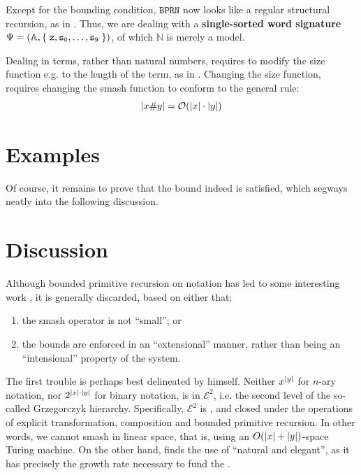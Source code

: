 Except for the bounding condition, $\mathtt{BPRN}$ now looks like a regular
structural recursion, as in . Thus, we are dealing
with a \textbf{single-sorted word signature} $\Psi = {\mathopen{}\left({\mathbb{A},
\mathopen{}\left\{\mathrel{}{\mathtt{z}, \mathtt{s_0}, \ldots, \mathtt{s_9}}\mathrel{}\right\}\mathclose{}}\right)\mathclose{}}$, of which $\mathbb{N}$
is merely a model.

Dealing in terms, rather than natural numbers, requires to modify the size
function e.g. to the length of the term, as in . Changing the size
function, requires changing the smash function to conform to the general
rule:\begin{align*}
%
\card{x\smashf{}y} = \bigOh{\card{x} \cdot \card{y}}
%
\end{align*}


\section{Examples}


Of course, it remains to prove that the bound indeed is satisfied, which
segways neatly into the following discussion.

\section{Discussion}

Although bounded primitive recursion on notation has led to some interesting
work \cite{cook-1975, buss-phd-1985-6, cook-urquhart-1993}, it is generally
discarded\cite{bellantoni-cook-1992}, based on either that:

\begin{enumerate}[label=(\arabic*)]

\item the smash operator is not ``small''; or

\item the bounds are enforced in an ``extensional'' manner, rather than being
an ``intensional'' property of the system.

\end{enumerate}

The first trouble is perhaps best delineated by \cite{cobham-1965} himself.
Neither $x^{\mathopen{}\left|{y}\right|\mathclose{}}$ for $n$-ary notation, nor $2^{{\mathopen{}\left|{x}\right|\mathclose{}} \cdot {\ensuremath{\mathopen{}\left|{y}\right|\mathclose{}}}}$
for binary notation, is in $\mathcal{E}^2$, i.e. the second level of the
so-called Grzegorczyk hierarchy\cite{grzegorczyk-1953}. Specifically,
$\mathcal{E}^2$ is , and closed under the operations of explicit
transformation, composition and bounded primitive recursion. In other words, we
cannot smash in linear space, that is, using an $O{\mathopen{}\left({{\mathopen{}\left|{x}\right|\mathclose{}}+{\mathopen{}\left|{y}\right|\mathclose{}}}\right)\mathclose{}}$-space
Turing machine\cite{ritchie-1963}. On the other hand, \cite{buss-phd-1985-6}
finds the use of \smashf{} ``natural and elegant'', as it has precisely the
growth rate necessary to fund the .

